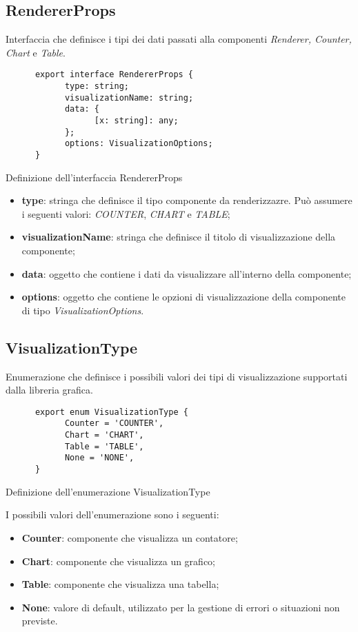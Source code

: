 \subsection{RendererProps}
Interfaccia che definisce i tipi dei dati passati alla componenti \textit{Renderer, Counter, Chart} e \textit{Table}.
\begin{listing}[H]
      \begin{verbatim}
      export interface RendererProps {
            type: string;
            visualizationName: string;
            data: {
                  [x: string]: any;
            };
            options: VisualizationOptions;
      }
      \end{verbatim}
      \caption{Definizione dell'interfaccia RendererProps}
      \label{listing:rendererProps}
\end{listing}
\begin{itemize}
      \item \textbf{type}: stringa che definisce il tipo componente da renderizzazre. Può assumere i seguenti valori: \textit{COUNTER}, \textit{CHART} e \textit{TABLE};
      \item \textbf{visualizationName}: stringa che definisce il titolo di visualizzazione della componente;
      \item \textbf{data}: oggetto che contiene i dati da visualizzare all'interno della componente;
      \item \textbf{options}: oggetto che contiene le opzioni di visualizzazione della componente di tipo \textit{VisualizationOptions}.
\end{itemize}

\subsection{VisualizationType}
Enumerazione che definisce i possibili valori dei tipi di visualizzazione supportati dalla libreria grafica.
\begin{listing}[H]
      \begin{verbatim}
      export enum VisualizationType {
            Counter = 'COUNTER',
            Chart = 'CHART',
            Table = 'TABLE',
            None = 'NONE',
      }
      \end{verbatim}
      \caption{Definizione dell'enumerazione VisualizationType}
      \label{listing:visualizationType}
\end{listing}
I possibili valori dell'enumerazione sono i seguenti:
\begin{itemize}
      \item \textbf{Counter}: componente che visualizza un contatore;
      \item \textbf{Chart}: componente che visualizza un grafico;
      \item \textbf{Table}: componente che visualizza una tabella;
      \item \textbf{None}: valore di default, utilizzato per la gestione di errori o situazioni non previste.
\end{itemize}

